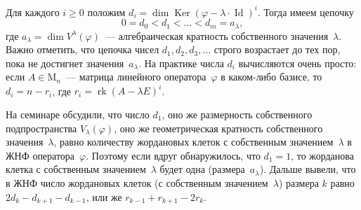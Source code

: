 \documentclass[10pt, a4paper]{extarticle}
\newcommand{\rk}{\operatorname{\mathrm{rk}}}
\newcommand{\Ker}{\mathop{\mathrm{Ker}}}
\newcommand{\Id}{\operatorname{Id}}
\theoremstyle{definition}
\begin{document}
Для каждого $i \geqslant 0$ положим $d_i = \dim \Ker (\varphi - \lambda \cdot \Id)^i$.
Тогда имеем цепочку
\[
0 = d_0 < d_1 < \ldots < d_m = a_\lambda,
\]
где $a_\lambda = \dim V^{\lambda}(\varphi)$~--- алгебраическая кратность собственного значения~$\lambda$.
Важно отметить, что цепочка чисел $d_1,d_2,d_3,\ldots$ строго возрастает до тех пор, пока не достигнет значения~$a_\lambda$.
На практике числа $d_i$ вычисляются очень просто: если $A \in \mathrm M_n$~--- матрица линейного оператора~$\varphi$ в каком-либо базисе, то $d_i = n - r_i$, где $r_i= \rk (A - \lambda E)^i$.

На семинаре обсудили, что число $d_1$, оно же размерность собственного подпространства $V_\lambda(\varphi)$, оно же геометрическая кратность собственного значения~$\lambda$, равно количеству жордановых клеток с собственным значением~$\lambda$ в ЖНФ оператора~$\varphi$.
Поэтому  если вдруг обнаружилось, что $d_1 = 1$, то жорданова клетка с собственным значением~$\lambda$ будет одна (размера~$a_\lambda$).
Дальше вывели, что в ЖНФ число жордановых клеток (с собственным значением~$\lambda$) размера $k$ равно $2d_k - d_{k+1} - d_{k-1}$, или же $r_{k-1} + r_{k+1} - 2r_k$.
\end{document}
